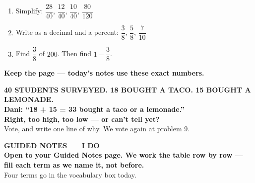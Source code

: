 \documentclass[aspectratio=169, 11pt]{beamer}
\begin{document}
\begin{frame}[t, plain]
  \vspace{0.3cm}
  \begin{center}
    \begin{minipage}{0.86\textwidth}
      \begin{enumerate}\setlength{\itemsep}{9pt}
        \item Simplify: \quad $\dfrac{28}{40}$, \quad $\dfrac{12}{40}$, \quad $\dfrac{10}{40}$,
              \quad $\dfrac{80}{120}$
        \item Write as a decimal and a percent: \quad $\dfrac38$, \quad $\dfrac58$, \quad
              $\dfrac{7}{10}$
        \item Find $\dfrac38$ of $200$. Then find $1 - \dfrac38$.
      \end{enumerate}
    \end{minipage}
  \end{center}
  \vspace{0.3cm}
  \begin{center}
    {\color{cerulean}\bfseries Keep the page --- today's notes use these exact numbers.}
  \end{center}
\end{frame}

{
\begin{frame}[plain]
  \vspace{1.1cm}
  \begin{center}
    {\color{frostmid}\bfseries\small 40 STUDENTS SURVEYED. 18 BOUGHT A TACO. 15 BOUGHT A LEMONADE.}\\[0.8cm]
    {\color{white}\bfseries\Large Dani: ``18 + 15 = 33 bought a taco or a lemonade.''}\\[0.9cm]
    {\color{goldacc}\bfseries\large Right, too high, too low --- or can't tell yet?}\\[0.5cm]
    {\color{frostmid}\small Vote, and write one line of why. We vote again at problem 9.}
  \end{center}
\end{frame}
}

{
\begin{frame}[plain]
  \vspace{1.8cm}\hspace{0.8cm}%
  \begin{minipage}{0.86\textwidth}
    {\color{goldacc}\bfseries\small GUIDED NOTES \ \textbullet\ \ I DO}\\[0.7cm]
    {\color{white}\bfseries\Large Open to your Guided Notes page. We work the table row by
    row --- fill each term as we name it, not before.}\\[0.9cm]
    {\color{frostmid}\small Four terms go in the vocabulary box today.}
  \end{minipage}
\end{frame}
}
\end{document}
